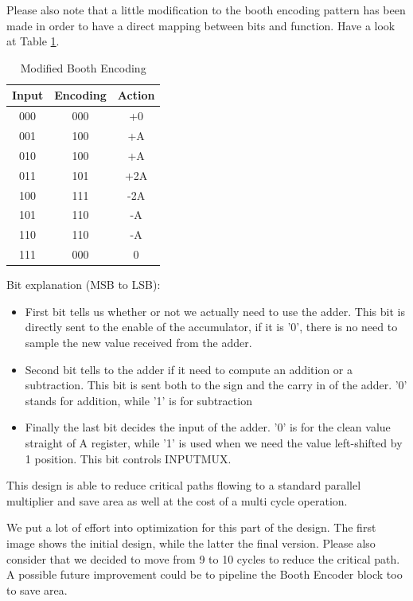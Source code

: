 \documentclass[12pt]{article}
\begin{document}
Please also note that a little modification to the booth encoding pattern has been made in order to have a direct mapping between bits and function. Have a look at Table \ref{BOOTHENC}.
\begin{table}
\begin{center}
	\begin{tabular}{ | c | c | c |}
		\hline
		\rowcolor{LimeGreen} Input & Encoding & Action \\ \hline
		000 & 000 & +0 \\ \hline
		001 & 100 & +A \\ \hline
		010 & 100 & +A \\ \hline
		011 & 101 & +2A \\ \hline
		100 & 111 & -2A \\ \hline
		101 & 110 & -A \\ \hline
		110 & 110 & -A \\ \hline
		111 & 000 & 0 \\ \hline
		
	\end{tabular}
	\caption{Modified Booth Encoding}
	\label{BOOTHENC}
\end{center}
\end{table}

Bit explanation (MSB to LSB):
\begin{itemize}
	\item First bit tells us whether or not we actually need to use the adder. This bit is directly sent to the enable of the accumulator, if it is '0', there is no need to sample the new value received from the adder.
	\item Second bit tells to the adder if it need to compute an addition or a subtraction. This bit is sent both to the sign and the carry in of the adder. '0' stands for addition, while '1' is for subtraction
	\item Finally the last bit decides the input of the adder. '0' is for the clean value straight of A register, while '1' is used when we need the value left-shifted by 1 position. This bit controls INPUTMUX.
\end{itemize}

This design is able to reduce critical paths flowing to a standard parallel multiplier and save area as well at the cost of a multi cycle operation. 

We put a lot of effort into optimization for this part of the design. The first image shows the initial design, while the latter the final version. Please also consider that we decided to move from 9 to 10 cycles to reduce the critical path.
A possible future improvement could be to pipeline the Booth Encoder block too to save area.
\end{document}
